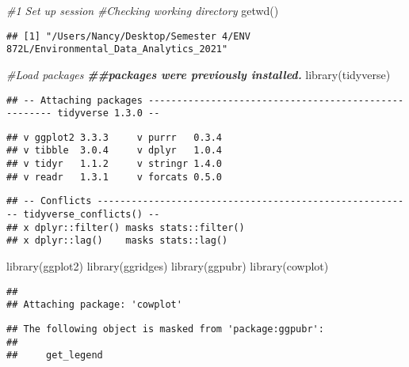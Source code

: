 \documentclass[
]{article}
\newenvironment{Shaded}{\begin{snugshade}}{\end{snugshade}}
\newcommand{\CommentTok}[1]{\textcolor[rgb]{0.56,0.35,0.01}{\textit{#1}}}
\newcommand{\DocumentationTok}[1]{\textcolor[rgb]{0.56,0.35,0.01}{\textbf{\textit{#1}}}}
\newcommand{\FunctionTok}[1]{\textcolor[rgb]{0.00,0.00,0.00}{#1}}
\newcommand{\NormalTok}[1]{#1}
\begin{document}
\begin{Shaded}
\begin{Highlighting}[]
\CommentTok{\#1 Set up session}
\CommentTok{\#Checking working directory}
\FunctionTok{getwd}\NormalTok{()}
\end{Highlighting}
\end{Shaded}

\begin{verbatim}
## [1] "/Users/Nancy/Desktop/Semester 4/ENV 872L/Environmental_Data_Analytics_2021"
\end{verbatim}

\begin{Shaded}
\begin{Highlighting}[]
\CommentTok{\#Load packages}
\DocumentationTok{\#\#packages were previously installed. }
\FunctionTok{library}\NormalTok{(tidyverse)}
\end{Highlighting}
\end{Shaded}

\begin{verbatim}
## -- Attaching packages ----------------------------------------------------- tidyverse 1.3.0 --
\end{verbatim}

\begin{verbatim}
## v ggplot2 3.3.3     v purrr   0.3.4
## v tibble  3.0.4     v dplyr   1.0.4
## v tidyr   1.1.2     v stringr 1.4.0
## v readr   1.3.1     v forcats 0.5.0
\end{verbatim}

\begin{verbatim}
## -- Conflicts -------------------------------------------------------- tidyverse_conflicts() --
## x dplyr::filter() masks stats::filter()
## x dplyr::lag()    masks stats::lag()
\end{verbatim}

\begin{Shaded}
\begin{Highlighting}[]
\FunctionTok{library}\NormalTok{(ggplot2)}
\FunctionTok{library}\NormalTok{(ggridges)}
\FunctionTok{library}\NormalTok{(ggpubr)}
\FunctionTok{library}\NormalTok{(cowplot)}
\end{Highlighting}
\end{Shaded}

\begin{verbatim}
## 
## Attaching package: 'cowplot'
\end{verbatim}

\begin{verbatim}
## The following object is masked from 'package:ggpubr':
## 
##     get_legend
\end{verbatim}
\end{document}

